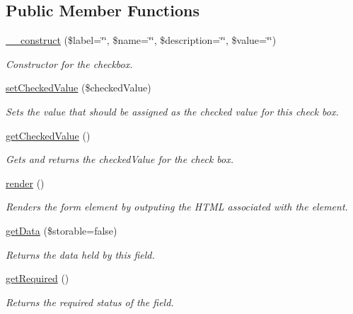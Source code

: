 \subsection*{Public Member Functions}
\begin{DoxyCompactItemize}
\item 
\hyperlink{class_checkbox_a0fd0e4264d85e4d8402f82e401b0a52a}{\_\-\_\-construct} (\$label=\char`\"{}\char`\"{}, \$name=\char`\"{}\char`\"{}, \$description=\char`\"{}\char`\"{}, \$value=\char`\"{}\char`\"{})
\begin{DoxyCompactList}\small\item\em Constructor for the checkbox. \item\end{DoxyCompactList}\item 
\hyperlink{class_checkbox_a47da7bc8e79cdb2e6d76973a50a74f7b}{setCheckedValue} (\$checkedValue)
\begin{DoxyCompactList}\small\item\em Sets the value that should be assigned as the checked value for this check box. \item\end{DoxyCompactList}\item 
\hyperlink{class_checkbox_af78d9523facd67502c5bbad100ed26c9}{getCheckedValue} ()
\begin{DoxyCompactList}\small\item\em Gets and returns the checkedValue for the check box. \item\end{DoxyCompactList}\item 
\hyperlink{class_checkbox_a0997d66168b7c017874f384286a88fe2}{render} ()
\begin{DoxyCompactList}\small\item\em Renders the form element by outputing the HTML associated with the element. \item\end{DoxyCompactList}\item 
\hyperlink{class_checkbox_a1d69a9bb1e9acc46e17dbdd0ac46ba29}{getData} (\$storable=false)
\begin{DoxyCompactList}\small\item\em Returns the data held by this field. \item\end{DoxyCompactList}\item 
\hyperlink{class_checkbox_ac20b8987d565ac45f782e970d9ad473f}{getRequired} ()
\begin{DoxyCompactList}\small\item\em Returns the required status of the field. \item\end{DoxyCompactList}\end{DoxyCompactItemize}
